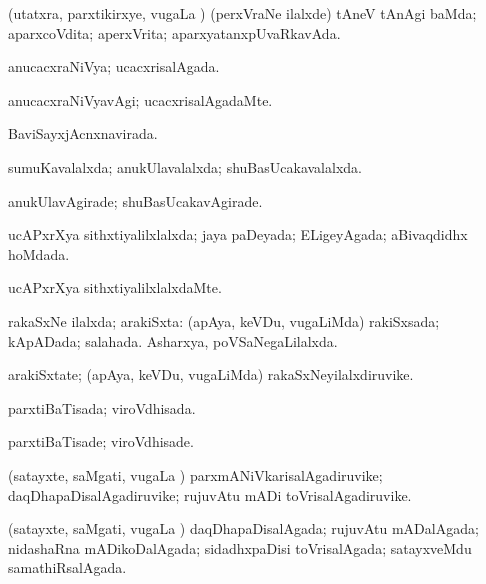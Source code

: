 \bentry
{} 
\gl{\gu}
\expl{}
\bmng
(utatxra, parxtikirxye, \mo vugaLa \vi) (perxVraNe ilalxde) tAneV tAnAgi baMda; aparxcoVdita; aperxVrita; aparxyatanxpUvaRkavAda. 
\emng
\eentry

\bentry
{} 
\gl{\gu}
\expl{}
\bmng
anucacxraNiVya; ucacxrisalAgada. 
\emng
\eentry

\bentry
{} 
\gl{\kirxvi}
\expl{}
\bmng
anucacxraNiVyavAgi; ucacxrisalAgadaMte. 
\emng
\eentry

\bentry
{} 
\gl{\gu}
\expl{}
\bmng
BaviSayxjAcnxnavirada. 
\emng
\eentry

\bentry
{} 
\gl{\gu}
\expl{}
\bmng
sumuKavalalxda; anukUlavalalxda; shuBasUcakavalalxda. 
\emng
\eentry

\bentry
{} 
\gl{\kirxvi}
\expl{}
\bmng
anukUlavAgirade; shuBasUcakavAgirade. 
\emng
\eentry

\bentry
{} 
\gl{\gu}
\expl{}
\bmng
ucAPxrXya sithxtiyalilxlalxda; jaya paDeyada; ELigeyAgada; aBivaqdidhx hoMdada. 
\emng
\eentry

\bentry
{} 
\gl{\kirxvi}
\expl{}
\bmng
ucAPxrXya sithxtiyalilxlalxdaMte. 
\emng
\eentry

\bentry
{} 
\gl{\gu}
\expl{}
\bmng
rakaSxNe ilalxda; arakiSxta: 
\banum
{} (apAya, keVDu, \mo vugaLiMda) rakiSxsada; kApADada; salahada. 
 Asharxya, poVSaNegaLilalxda. 
\eanum
\emng
\eentry

\bentry
{} 
\gl{\nA}
\expl{}
\bmng
arakiSxtate; (apAya, keVDu, \mo vugaLiMda) rakaSxNeyilalxdiruvike. 
\emng
\eentry

\bentry
{} 
\gl{\gu}
\expl{}
\bmng
parxtiBaTisada; viroVdhisada. 
\emng
\eentry

\bentry
{} 
\gl{\kirxvi}
\expl{}
\bmng
parxtiBaTisade; viroVdhisade. 
\emng
\eentry

\bentry
{} 
\gl{\nA}
\expl{}
\bmng
(satayxte, saMgati, \mo vugaLa \vi) parxmANiVkarisalAgadiruvike; daqDhapaDisalAgadiruvike; rujuvAtu mADi toVrisalAgadiruvike. 
\emng
\eentry

\bentry
{} 
\gl{\gu}
\expl{}
\bmng
(satayxte, saMgati, \mo vugaLa \vi) daqDhapaDisalAgada; rujuvAtu mADalAgada; nidashaRna mADikoDalAgada; sidadhxpaDisi toVrisalAgada; satayxveMdu samathiRsalAgada. 
\emng
\eentry

